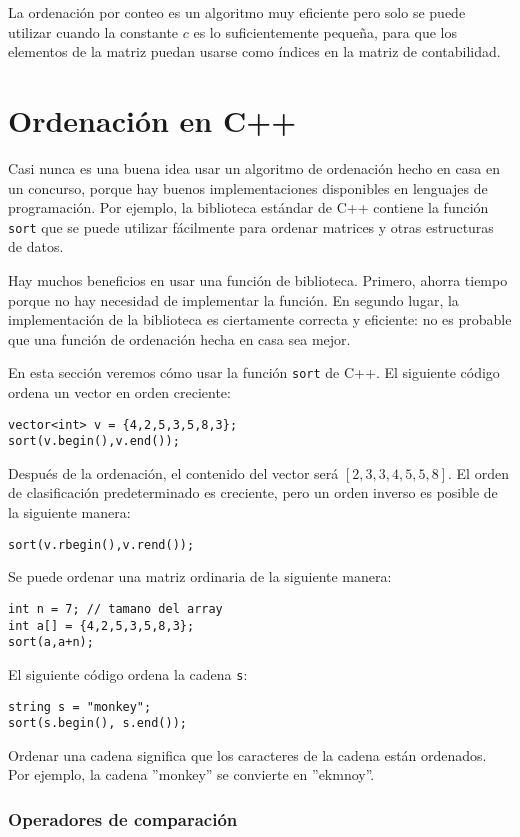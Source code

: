 La ordenación por conteo es un algoritmo muy eficiente
pero solo se puede utilizar cuando la constante $c$
es lo suficientemente pequeña, para que los elementos de la matriz puedan
usarse como índices en la matriz de contabilidad.

\section{Ordenación en C++}


Casi nunca es una buena idea usar
un algoritmo de ordenación hecho en casa
en un concurso, porque hay buenos
implementaciones disponibles en lenguajes de programación.
Por ejemplo, la biblioteca estándar de C++ contiene
la función \texttt{sort} que se puede utilizar fácilmente para
ordenar matrices y otras estructuras de datos.

Hay muchos beneficios en usar una función de biblioteca.
Primero, ahorra tiempo porque no hay necesidad de
implementar la función.
En segundo lugar, la implementación de la biblioteca es
ciertamente correcta y eficiente: no es probable
que una función de ordenación hecha en casa sea mejor.

En esta sección veremos cómo usar la función \texttt{sort} de C++.
El siguiente código ordena un vector en orden creciente:
\begin{lstlisting}
vector<int> v = {4,2,5,3,5,8,3};
sort(v.begin(),v.end());
\end{lstlisting}
Después de la ordenación, el contenido del vector será
$[2,3,3,4,5,5,8]$.
El orden de clasificación predeterminado es creciente,
pero un orden inverso es posible de la siguiente manera:
\begin{lstlisting}
sort(v.rbegin(),v.rend());
\end{lstlisting}
Se puede ordenar una matriz ordinaria de la siguiente manera:
\begin{lstlisting}
int n = 7; // tamano del array
int a[] = {4,2,5,3,5,8,3};
sort(a,a+n);
\end{lstlisting}

\newpage
El siguiente código ordena la cadena \texttt{s}:
\begin{lstlisting}
string s = "monkey";
sort(s.begin(), s.end());
\end{lstlisting}
Ordenar una cadena significa que los caracteres
de la cadena están ordenados.
Por ejemplo, la cadena ''monkey'' se convierte en ''ekmnoy''.

\subsubsection{Operadores de comparación}


